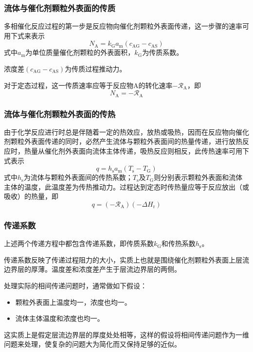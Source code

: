 \documentclass[dvipsnames, svgnames, x11names]{beamer}
\begin{document}
\begin{frame}
    \frametitle{流体与催化剂颗粒外表面的传质}

    多相催化反应过程的第一步是反应物向催化剂颗粒外表面传递，这一步骤的速率可用下式来表示
    \[
        N_{\mathrm{A}} =k_{\mathrm{G}} a_{\mathrm{m}}(c_{\mathrm{AG}}-c_{\mathrm{AS}})
    \]
    式中$a_{\mathrm{m}}$为单位质量催化剂颗粒的外表面积，$k_{\mathrm{G}}$为传质系数。
    
    浓度差$(c_{\mathrm{AG}}-c_{\mathrm{AS}})$为传质过程推动力。
    
    对于定态过程，这一传质速率应等于反应物A的转化速率$-\mathscr{R}_{\mathrm{A}}$，即
    \[
        N_{\mathrm{A}} = -\mathscr{R}_{\mathrm{A}}
    \]

\end{frame}


\begin{frame}
    \frametitle{流体与催化剂颗粒外表面的传热}

    由于化学反应进行时总是伴随着一定的热效应，放热或吸热，因而在反应物向催化剂颗粒外表面传递的同时，必然产生流体与颗粒外表面间的热量传递，进行放热反应时，热量从催化剂外表面向流体主体传递，吸热反应则相反，此传热速率可用下式表示
    \[
        q = h_{\mathrm{s}} a_{\mathrm{m}}(T_{\mathrm{s}}-T_{\mathrm{G}})
    \]
    式中$h_{\mathrm{s}}$为流体与颗粒外表面间的传热系数；$T_{\mathrm{s}}$及$T_{\mathrm{G}}$则分别表示颗粒外表面和流体主体的温度，此温度差为传热推动力。过程达到定态时传热量应等于反应放出（或吸收）的热量，即
    \[
        q =(-\mathscr{R}_{\mathrm{A}})(-\Delta H_{\mathrm{r}})
    \]

\end{frame}


\begin{frame}
    \frametitle{传递系数}

    上述两个传递方程中都包含传递系数，即传质系数$k_{\mathrm{G}}$和传热系数$h_{\mathrm{s}}$。
    
    传递系数反映了传递过程阻力的大小，实质上也就是围绕催化剂颗粒外表面上层流边界层的厚薄。温度差和浓度差产生于层流边界层的两侧。
    
    处理实际的相间传递问题时，通常做如下假设：
    \begin{itemize}
        \item 颗粒外表面上温度均一，浓度也均一。
        \item 流体主体温度和浓度也均一。
    \end{itemize}
    这实质上是假定层流边界层的厚度处处相等，这样的假设将相间传递问题作为一维问题来处理，使复杂的问题大为简化而又保持足够的近似。
    
\end{frame}
\end{document}
